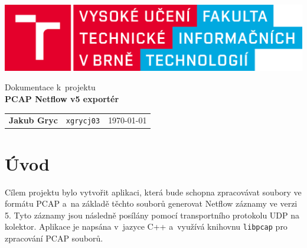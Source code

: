 \documentclass[a4paper, 11pt]{article}
\begin{document}
\begin{sloppypar}
\begin{titlepage}
		\begin{center}
			\includegraphics[width=0.85\linewidth]{./figs/logo_cz.png} \\


			\Huge{Dokumentace k~projektu} \\
			\LARGE{\textbf{PCAP Netflow v5 exportér}} \\
		\end{center}

			\Large

   
            \begin{tabularx}{0.96\textwidth}{ll>{\raggedleft\arraybackslash}X}
                \textbf{Jakub Gryc} & \texttt{xgrycj03} &  \Large\today \\ 
			\end{tabularx}


	\end{titlepage}

\tableofcontents

\newpage
\section{Úvod}

Cílem projektu bylo vytvořit aplikaci, která bude schopna zpracovávat soubory ve formátu PCAP a~na základě těchto souborů generovat Netflow záznamy ve verzi 5. Tyto záznamy jsou následně posílány pomocí transportního protokolu UDP na kolektor. Aplikace je napsána v~jazyce C++ a~využívá knihovnu \texttt{libpcap} pro zpracování PCAP souborů.


\end{sloppypar}
\end{document}

